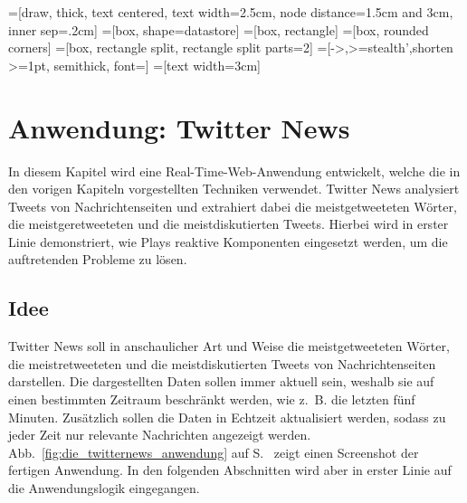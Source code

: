 
\makeatletter
{}
\makeatother

=[draw, thick, text centered, text width=2.5cm, node distance=1.5cm and 3cm, inner sep=.2cm]
=[box, shape=datastore]
=[box, rectangle]
=[box, rounded corners]
=[box, rectangle split, rectangle split parts=2]
=[->,>=stealth',shorten >=1pt, semithick, font=\footnotesize]
=[text width=3cm]

\chapter{Anwendung: Twitter News} %
\label{cha:anwendung}

In diesem Kapitel wird eine Real-Time-Web-Anwendung entwickelt, welche die in den vorigen Kapiteln vorgestellten Techniken verwendet.
Twitter News analysiert Tweets von Nachrichtenseiten und extrahiert dabei die meistgetweeteten Wörter, die meistgeretweeteten und die meistdiskutierten Tweets.
Hierbei wird in erster Linie demonstriert, wie Plays reaktive Komponenten eingesetzt werden, um die auftretenden Probleme zu lösen.

\section{Idee} %
\label{sec:idee}

Twitter News soll in anschaulicher Art und Weise die meistgetweeteten Wörter, die meistretweeteten und die meistdiskutierten Tweets von Nachrichtenseiten darstellen.
Die dargestellten Daten sollen immer aktuell sein, weshalb sie auf einen bestimmten Zeitraum beschränkt werden, wie z.~B. die letzten fünf Minuten.
Zusätzlich sollen die Daten in Echtzeit aktualisiert werden, sodass zu jeder Zeit nur relevante Nachrichten angezeigt werden.
Abb.~\ref{fig:die_twitternews_anwendung} auf S.~\pageref{fig:die_twitternews_anwendung} zeigt einen Screenshot der fertigen Anwendung.
In den folgenden Abschnitten wird aber in erster Linie auf die Anwendungslogik eingegangen.

